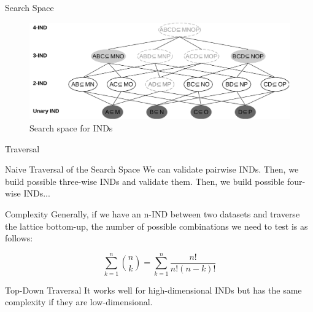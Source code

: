 \documentclass[10pt]{beamer}
\begin{document}
\begin{frame}{Search Space}
\begin{figure}
    \centering
    \includegraphics[width=\textwidth]{lattice.pdf}
    \caption{Search space for INDs}
\end{figure}
\end{frame}

\begin{frame}{Traversal}
    \begin{block}{Naive Traversal of the Search Space}
        \smallskip
        We can validate pairwise INDs. Then, we build possible three-wise INDs and validate them.
        Then, we build possible four-wise INDs...
    \end{block}
        
    \begin{alertblock}{Complexity}
    \smallskip
    Generally, if we have an n-IND between two datasets and traverse the lattice bottom-up,
    the number of possible combinations we need to test is as follows:
    
    \begin{equation*}
        \sum_{k=1}^{n}{\binom{n}{k}} = \sum_{k=1}^{n} \frac{n!}{n!(n - k)!}
    \end{equation*}
    
    \end{alertblock}

    \begin{block}{Top-Down Traversal}
        It works well for high-dimensional INDs but has the same complexity if they are
        low-dimensional.
    \end{block}

\end{frame}
\end{document}
